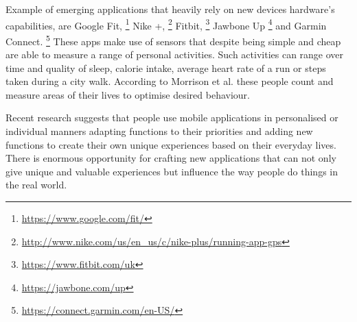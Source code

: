 Example of emerging applications that heavily rely on new devices hardware's capabilities, are Google Fit, \footnote{\url{https://www.google.com/fit/}} Nike +, \footnote{\url{http://www.nike.com/us/en_us/c/nike-plus/running-app-gps}} Fitbit, \footnote{\url{https://www.fitbit.com/uk}} Jawbone Up \footnote{\url{https://jawbone.com/up}} and Garmin Connect. \footnote{\url{https://connect.garmin.com/en-US/}} These apps make use of sensors that despite being simple and cheap are able to measure a range of personal activities. Such activities can range over time and quality of sleep, calorie intake, average heart rate of a run or steps taken during a city walk. According to Morrison et al. \cite{Rooksby2014} these people count and measure areas of their lives to optimise desired behaviour.

Recent research \cite{Barkhuus2011} suggests that people use mobile applications in personalised or individual manners adapting functions to their priorities and adding new functions to create their own unique experiences based on their everyday lives. There is enormous opportunity for crafting new applications that can not only  give unique and valuable experiences but influence the way people do things in the real world. 


